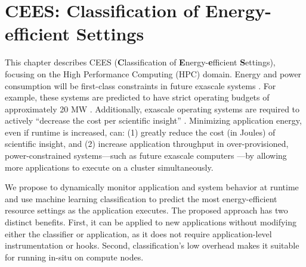 \chapter{CEES: Classification of Energy-efficient Settings}

This chapter describes CEES (\textbf{C}lassification of \textbf{E}nergy-\textbf{e}fficient \textbf{S}ettings), focusing on the High Performance Computing (HPC) domain.
Energy and power consumption will be first-class constraints in future exascale systems \cite{exaosr-power}.
For example, these systems are predicted to have strict operating budgets of approximately 20 MW \cite{Exascale20MW}.
Additionally, exascale operating systems are required to actively ``decrease the cost per scientific insight'' \cite{DOEML}.  
Minimizing application energy, even if runtime is increased, can: (1) greatly reduce the cost (in Joules) of scientific insight, and (2) increase application throughput in over-provisioned, power-constrained systems---such as future exascale computers \cite{PatkiRMAP,Sarood2013}---by allowing more applications to execute on a cluster simultaneously.

We propose to dynamically monitor application and system behavior at runtime and use machine learning classification to predict the most energy-efficient resource settings as the application executes.
The proposed approach has two distinct benefits.
First, it can be applied to new applications without modifying either the classifier or application, as it does not require application-level instrumentation or hooks.
Second, classification's low overhead makes it suitable for running in-situ on compute nodes.






